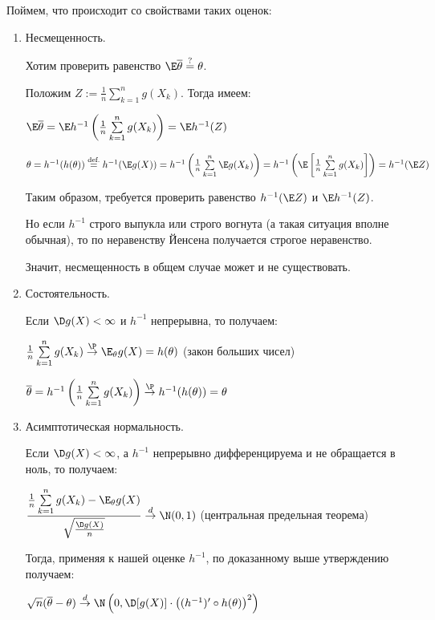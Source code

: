 \begin{properties}
	\slashns
	
	Поймем, что происходит со свойствами таких оценок:
	
	\vspace*{-10pt}
	\begin{enumerate}
		\item Несмещенность.
		
		Хотим проверить равенство $\E \overline{\theta} \overset{?}{=} \theta$.
		
		Положим $Z := \frac1n \sum\limits_{k=1}^{n} g(X_k)$. Тогда имеем:
		
		$\E \overline{\theta} = \E h^{-1}\left(\frac1n \sum\limits_{k=1}^{n} g(X_k) \right) = \E h^{-1}(Z)$
		
		$\theta = h^{-1}(h(\theta)) \overset{\text{def.}}{=} h^{-1}(\E g(X)) = h^{-1}\left(\frac1n \sum\limits_{k=1}^{n} \E g(X_k) \right) = h^{-1}\left(\E \left[\frac1n \sum\limits_{k=1}^{n} g(X_k) \right] \right) = h^{-1}(\E Z)$
		
		Таким образом, требуется проверить равенство $h^{-1}(\E Z)$ и $\E h^{-1}(Z)$. 
		
		Но если $h^{-1}$ строго выпукла или строго вогнута (а такая ситуация вполне обычная), то по неравенству Йенсена получается строгое неравенство.
		
		Значит, несмещенность в общем случае может и не существовать.
		
		\item Состоятельность.
		
		Если $\D g(X) < \infty$ и $h^{-1}$ непрерывна, то получаем:
		
		$\frac1n \sum\limits_{k=1}^{n} g(X_k) \overset{\P}{\to} \E_{\theta} g(X) = h(\theta)$ (закон больших чисел)
		
		$\overline{\theta} = h^{-1}\left(\frac1n \sum\limits_{k=1}^{n} g(X_k)\right) \overset{\P}{\to} h^{-1}(h(\theta)) = \theta$
	
		\item Асимптотическая нормальность.
		
		Если $\D g(X) < \infty$, а $h^{-1}$ непрерывно дифференцируема и не обращается в ноль, то получаем:
		
		$\dfrac{\frac1n \sum\limits_{k=1}^{n} g(X_k) - \E_{\theta} g(X)}{\sqrt{\frac{\D g(X)}{n}}} \overset{d}{\to} \N(0, 1)$ (центральная предельная теорема)
		
		Тогда, применяя к нашей оценке $h^{-1}$, по доказанному выше утверждению получаем:
		
		$\sqrt{n} (\overline{\theta} - \theta) \overset{d}{\to} \N \left(0, \D[g(X)] \cdot \left((h^{-1})' \circ h(\theta) \right)^2\right)$
	\end{enumerate}
\end{properties}




